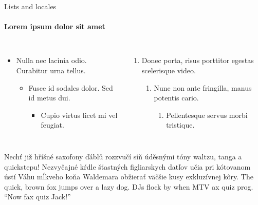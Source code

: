 \documentclass{beamer}
\begin{document}
    \begin{frame}[label=lists]{Lists and locales}
      \framesubtitle{Lorem ipsum dolor sit amet}
      \begin{columns}[onlytextwidth]
          \begin{itemize}
            \item Nulla nec lacinia odio. Curabitur urna tellus.
            \begin{itemize}
              \item Fusce id sodales dolor. Sed id metus dui.
              \begin{itemize}
                \item Cupio virtus licet mi vel feugiat.
              \end{itemize}
            \end{itemize}
          \end{itemize}
          \begin{enumerate}
            \item Donec porta, risus porttitor egestas scelerisque video.
            \begin{enumerate}
              \item Nunc non ante fringilla, manus potentis cario.
              \begin{enumerate}
                \item Pellentesque servus morbi tristique.
              \end{enumerate}
            \end{enumerate}
          \end{enumerate}
      \end{columns}
      \bigskip
      \justifying

      {Nechť již hříšné saxofony ďáblů
      rozzvučí síň úděsnými tóny waltzu, tanga a quickstepu!}
      { Nezvyčajné kŕdle šťastných figliarskych
      ďatľov učia pri kótovanom ústí Váhu mĺkveho koňa Waldemara
      obžierať väč\-šie kusy exkluzívnej kôry.}
      {The quick, brown fox jumps over a lazy
      dog. DJs flock by when MTV ax quiz prog. “Now fax quiz Jack!”}
    \end{frame}
\end{document}
